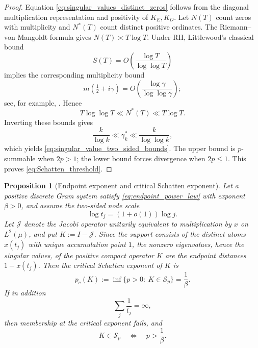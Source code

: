 \documentclass[11pt]{amsart}
\numberwithin{equation}{section}
\theoremstyle{plain}
\newtheorem{proposition}[theorem]{Proposition}
\theoremstyle{definition}
\theoremstyle{remark}
\newcommand{\RH}{\mathrm{RH}}
\begin{document}
\begin{proof}
Equation \eqref{eq:singular_values_distinct_zeros} follows from the diagonal multiplication representation and positivity of $K_E,K_O$.  Let $N(T)$ count zeros with multiplicity and $N^*(T)$ count distinct positive ordinates.  The Riemann--von Mangoldt formula gives $N(T)\asymp T\log T$.  Under $\RH$, Littlewood's classical bound
\begin{equation}
S(T)=O\!\left(\frac{\log T}{\log\log T}\right)
\label{eq:Littlewood_S_bound}
\end{equation}
implies the corresponding multiplicity bound
\begin{equation}
m(\tfrac12+i\gamma)
=O\!\left(\frac{\log\gamma}{\log\log\gamma}\right);
\label{eq:RH_multiplicity_bound}
\end{equation}
see, for example, \cite{Titchmarsh1986}.  Hence
\begin{equation}
T\log\log T\ll N^*(T)\ll T\log T.
\label{eq:distinct_zero_count_bounds}
\end{equation}
Inverting these bounds gives
\begin{equation}
\frac{k}{\log k}\ll\gamma_k^*\ll\frac{k}{\log\log k},
\label{eq:distinct_ordinate_bounds}
\end{equation}
which yields \eqref{eq:singular_value_two_sided_bounds}.  The upper bound is $p$-summable when $2p>1$; the lower bound forces divergence when $2p\le1$.  This proves \eqref{eq:Schatten_threshold}.
\end{proof}

\begin{proposition}[Endpoint exponent and critical Schatten exponent]
\label{prop:schatten_endpoint_exponent}
Let a positive discrete Gram system satisfy \eqref{eq:endpoint_power_law} with exponent $\beta>0$, and assume the two-sided node scale
\begin{equation}
\log t_j=(1+o(1))\log j.
\label{eq:two_sided_node_scale}
\end{equation}
Let $\mathcal J$ denote the Jacobi operator unitarily equivalent to multiplication by $x$ on $L^2(\mu)$, and put $K:=I-\mathcal J$. Since the support consists of the distinct atoms $x(t_j)$ with unique accumulation point $1$, the nonzero eigenvalues, hence the singular values, of the positive compact operator $K$ are the endpoint distances $1-x(t_j)$. Then the critical Schatten exponent of $K$ is
\begin{equation}
p_c(K):=\inf\{p>0:\ K\in\mathcal S_p\}=\frac1\beta.
\label{eq:critical_schatten_exponent}
\end{equation}
If in addition
\begin{equation}
\sum_j\frac1{t_j}=\infty,
\label{eq:endpoint_divergence_hypothesis}
\end{equation}
then membership at the critical exponent fails, and
\begin{equation}
K\in\mathcal S_p
\quad\Longleftrightarrow\quad
p>\frac1\beta.
\label{eq:schatten_threshold_general_beta}
\end{equation}
\end{proposition}
\end{document}
